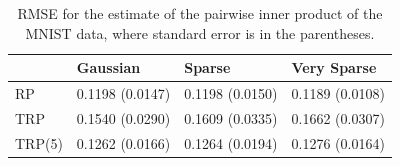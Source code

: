 \begin{table}[H]
	\centering
	\begin{tabular}{l|l|l|l}
		& Gaussian        & Sparse          & Very Sparse     \\ \hline
		RP & 0.1198 (0.0147) & 0.1198 (0.0150) & 0.1189 (0.0108) \\ \hline
		TRP    & 0.1540 (0.0290) & 0.1609 (0.0335) & 0.1662 (0.0307) \\ \hline
		TRP(5) & 0.1262 (0.0166) & 0.1264 (0.0194) & 0.1276 (0.0164)
	\end{tabular}
	\caption{RMSE for the estimate of the pairwise inner product of the MNIST data, where standard error is in the parentheses.} \label{tbl:mnist_inner_prod}
\end{table}